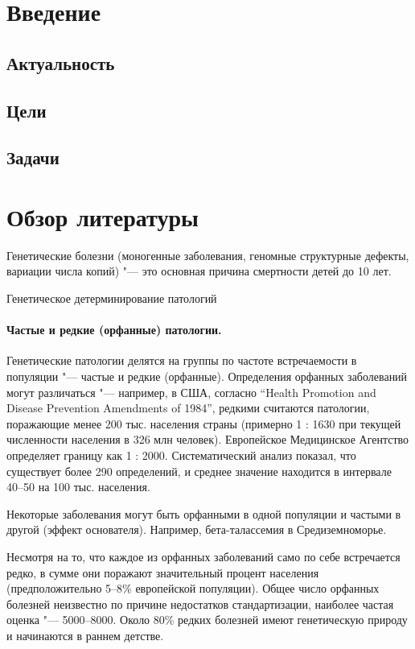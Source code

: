 \documentclass[a4paper,12pt]{article}
\begin{document}
\tableofcontents

\section{Введение}

\subsection{Актуальность}

\subsection{Цели}

\subsection{Задачи}

\section{Обзор литературы}

Генетические болезни (моногенные заболевания, геномные структурные дефекты, вариации числа копий) "--- это основная причина смертности детей до 10 лет.

Генетическое детерминирование патологий

\paragraph{Частые и редкие (орфанные) патологии.}
Генетические патологии делятся на группы по частоте встречаемости в популяции "--- частые и редкие (орфанные).
Определения орфанных заболеваний могут различаться "--- например, в США, согласно ``Health Promotion and Disease Prevention Amendments of 1984'', редкими считаются патологии, поражающие менее 200 тыс. населения страны (примерно 1 : 1630 при текущей численности населения в 326 млн человек)\cite{herder}.
Европейское Медицинское Агентство определяет границу как 1 : 2000.
Систематический анализ показал, что существует более 290 определений, и среднее значение находится в интервале 40--50 на 100 тыс. населения\cite{richter}.

Некоторые заболевания могут быть орфанными в одной популяции и частыми в другой (эффект основателя).
Например, бета-талассемия в Средиземноморье.

Несмотря на то, что каждое из орфанных заболеваний само по себе встречается редко, в сумме они поражают значительный процент населения (предположительно 5--8\% европейской популяции).
Общее число орфанных болезней неизвестно по причине недостатков стандартизации, наиболее частая оценка "--- 5000--8000.
Около 80\% редких болезней имеют генетическую природу и начинаются в раннем детстве\cite{lancet}.
\end{document}
